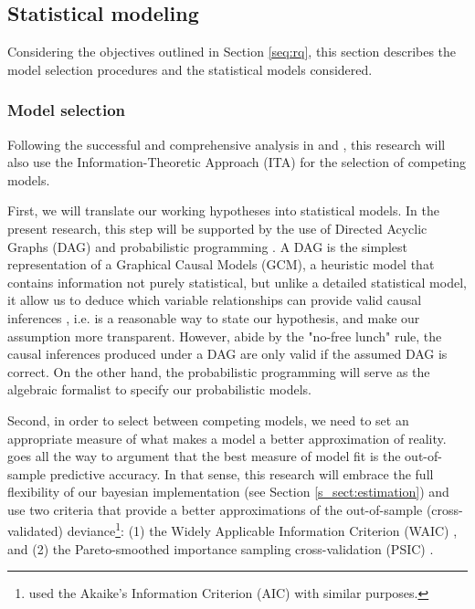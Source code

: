 \subsection{Statistical modeling} \label{s_sect:models}
%
Considering the objectives outlined in Section \ref{seq:rq}, this section describes the model selection procedures and the statistical models considered.
%
\subsubsection{Model selection}
%
Following the successful and comprehensive analysis in \citet{vanDaal_2020} and \citet{Lesterhuis_2018}, this research will also use the Information-Theoretic Approach (ITA) \citep{Anderson_2008, Chamberlain_1965} for the selection of competing models. 

First, we will translate our working hypotheses into statistical models. In the present research, this step will be supported by the use of Directed Acyclic Graphs (DAG) and probabilistic programming \citep{Jaynes_2003}. A DAG is the simplest representation of a Graphical Causal Models (GCM), a heuristic model that contains information not purely statistical, but unlike a detailed statistical model, it allow us to deduce which variable relationships can provide valid causal inferences \citep{Hernan_et_al_2020, McElreath_2020}, i.e. is a reasonable way to state our hypothesis, and make our assumption more transparent. However, abide by the "no-free lunch" rule, the causal inferences produced under a DAG are only valid if the assumed DAG is correct. On the other hand, the probabilistic programming will serve as the algebraic formalist to specify our probabilistic models.

Second, in order to select between competing models, we need to set an appropriate measure of what makes a model a better approximation of reality. \citet{McElreath_2020} goes all the way to argument that the best measure of model fit is the out-of-sample predictive accuracy. In that sense, this research will embrace the full flexibility of our bayesian implementation (see Section \ref{s_sect:estimation}) and use two criteria that provide a better approximations of the out-of-sample (cross-validated) deviance\footnote{\citet{vanDaal_2020} used the Akaike’s Information Criterion (AIC) \citep{Akaike_1974} with similar purposes.}: (1) the Widely Applicable Information Criterion (WAIC) \citep{Watanabe_2013}, and (2) the Pareto-smoothed importance sampling cross-validation (PSIC) \citep{Vehtari_et_al_2021}. 

